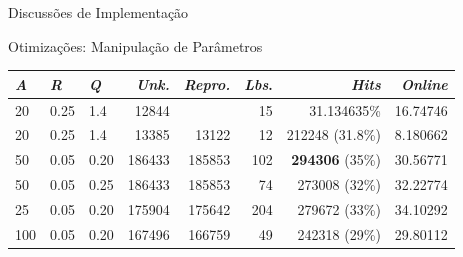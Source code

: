 \documentclass[aspectratio=43,10pt]{beamer}
\begin{document}
\begin{frame}[fragile]{Discussões de Implementação}
  \begin{alertblock}{Otimizações: Manipulação de Parâmetros}
    \footnotesize{
      \begin{tabular}
      {l          | l           | l           || r            | r               | r             | r                      | r                }
      \textit{A}  & \textit{R}  & \textit{Q}  & \textit{Unk.} & \textit{Repro.} & \textit{Lbs}. & \textit{Hits}          & \textit{Online}  \\\hline\hline
      20          & 0.25        & 1.4         & 12844         &                 & 15            & 31.134635\%            & 16.74746         \\\hline
      20          & 0.25        & 1.4         & 13385         & 13122           & 12            & 212248 (31.8\%)        & 8.180662         \\\hline
      50          & 0.05        & 0.20        & 186433        & 185853          & 102           & \textbf{294306} (35\%) & 30.56771         \\\hline
      50          & 0.05        & 0.25        & 186433        & 185853          & 74            & 273008 (32\%)          & 32.22774         \\\hline
      25          & 0.05        & 0.20        & 175904        & 175642          & 204           & 279672 (33\%)          & 34.10292         \\\hline
      100         & 0.05        & 0.20        & 167496        & 166759          & 49            & 242318 (29\%)          & 29.80112         \\
      \end{tabular}}
  \end{alertblock}
\end{frame}
\end{document}
